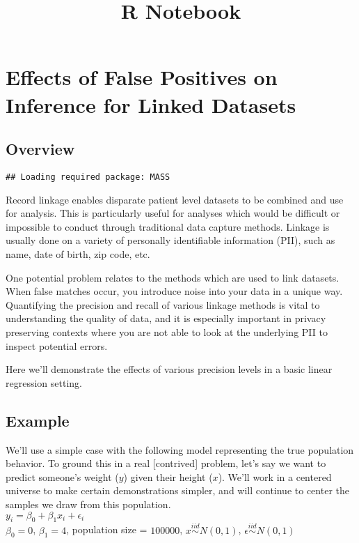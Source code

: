 \documentclass[
]{article}
\title{R Notebook}
\author{}
\date{\vspace{-2.5em}}
\begin{document}
\maketitle

\hypertarget{effects-of-false-positives-on-inference-for-linked-datasets}{%
\section{Effects of False Positives on Inference for Linked
Datasets}\label{effects-of-false-positives-on-inference-for-linked-datasets}}

\hypertarget{overview}{%
\subsection{Overview}\label{overview}}

\begin{verbatim}
## Loading required package: MASS
\end{verbatim}

Record linkage enables disparate patient level datasets to be combined
and use for analysis. This is particularly useful for analyses which
would be difficult or impossible to conduct through traditional data
capture methods. Linkage is usually done on a variety of personally
identifiable information (PII), such as name, date of birth, zip code,
etc.

One potential problem relates to the methods which are used to link
datasets. When false matches occur, you introduce noise into your data
in a unique way. Quantifying the precision and recall of various linkage
methods is vital to understanding the quality of data, and it is
especially important in privacy preserving contexts where you are not
able to look at the underlying PII to inspect potential errors.

Here we'll demonstrate the effects of various precision levels in a
basic linear regression setting.

\hypertarget{example}{%
\subsection{Example}\label{example}}

We'll use a simple case with the following model representing the true
population behavior. To ground this in a real {[}contrived{]} problem,
let's say we want to predict someone's weight (\(y\)) given their height
(\(x\)). We'll work in a centered universe to make certain
demonstrations simpler, and will continue to center the samples we draw
from this population.\\
\(y_i = \beta_0+\beta_1x_i+\epsilon_i\)\\
\(\beta_0=0\), \(\beta_1=4\), population size = \(100000\),
\(x \stackrel{iid} \sim N(0,1)\), \(\epsilon \stackrel{iid}\sim N(0,1)\)
\end{document}

